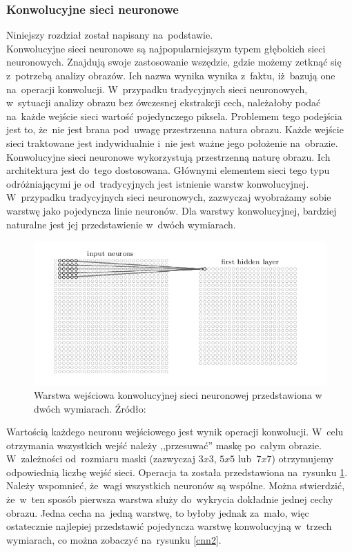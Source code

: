 \subsubsection{Konwolucyjne sieci neuronowe}
Niniejszy rozdział został napisany na~podstawie\cite{nielsen}.\\
Konwolucyjne sieci neuronowe są najpopularniejszym typem głębokich sieci neuronowych. Znajdują swoje zastosowanie wszędzie, gdzie możemy zetknąć się z~potrzebą analizy obrazów. Ich nazwa wynika wynika z~faktu, iż~bazują one na~operacji konwolucji. W~przypadku tradycyjnych sieci neuronowych, w~sytuacji analizy obrazu bez ówczesnej ekstrakcji cech, należałoby podać na~każde wejście sieci wartość pojedynczego piksela. Problemem tego podejścia jest to, że~nie jest brana pod~uwagę przestrzenna natura obrazu. Każde wejście sieci traktowane jest indywidualnie i~nie jest ważne jego położenie na~obrazie.  Konwolucyjne sieci neuronowe wykorzystują przestrzenną naturę obrazu. Ich architektura jest do~tego dostosowana. Głównymi elementem sieci tego typu odróżniającymi je od~tradycyjnych jest istnienie warstw konwolucyjnej. W~przypadku tradycyjnych sieci neuronowych, zazwyczaj wyobrażamy sobie warstwę jako pojedyncza linie neuronów. Dla warstwy konwolucyjnej, bardziej naturalne jest jej przedstawienie w~dwóch wymiarach.
\begin{figure}[ht!]
\centering
\includegraphics[scale=0.6]{res/cnn1.png}
\caption[Caption for LOF]{Warstwa wejściowa konwolucyjnej sieci neuronowej przedstawiona w dwóch wymiarach. Źródło:\cite{nielsen}\label{cnn1}} 
\end{figure}

Wartością każdego neuronu wejściowego jest wynik operacji konwolucji. W~celu otrzymania wszystkich wejść należy ,,przesuwać'' maskę po~całym obrazie. W~zależności od~rozmiaru maski (zazwyczaj $3x3$, $5x5$ lub~$7x7$) otrzymujemy odpowiednią liczbę wejść sieci. Operacja ta została przedstawiona na~rysunku \ref{cnn1}. Należy wspomnieć, że~wagi wszystkich neuronów są wspólne. Można stwierdzić, że~w~ten sposób pierwsza warstwa służy do~wykrycia dokładnie jednej cechy obrazu. Jedna cecha na~jedną warstwę, to byłoby jednak za~mało, więc ostatecznie najlepiej przedstawić pojedyncza warstwę konwolucyjną w~trzech wymiarach, co można zobaczyć na~rysunku \ref{cnn2}.

